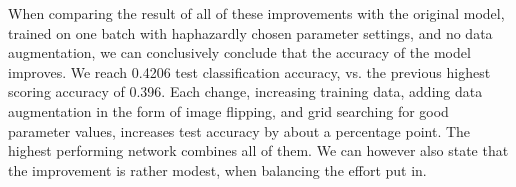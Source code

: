 \documentclass[11pt,a4paper]{article}
\begin{document}
When comparing the result of all of these improvements with the original model, trained on one batch with haphazardly chosen parameter settings, and no data augmentation, we can conclusively conclude that the accuracy of the model improves. We reach 0.4206 test classification accuracy, vs. the previous highest scoring accuracy of 0.396. Each change, increasing training data, adding data augmentation in the form of image flipping, and grid searching for good parameter values, increases test accuracy by about a percentage point. The highest performing network combines all of them. We can however also state that the improvement is rather modest, when balancing the effort put in.
\end{document}
